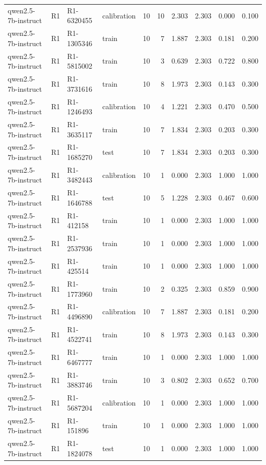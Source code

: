 \begin{table}
\begin{tabular}{llllrrrrrr}
qwen2.5-7b-instruct & R1 & R1-6320455 & calibration & 10 & 10 & 2.303 & 2.303 & 0.000 & 0.100 \\
qwen2.5-7b-instruct & R1 & R1-1305346 & train & 10 & 7 & 1.887 & 2.303 & 0.181 & 0.200 \\
qwen2.5-7b-instruct & R1 & R1-5815002 & train & 10 & 3 & 0.639 & 2.303 & 0.722 & 0.800 \\
qwen2.5-7b-instruct & R1 & R1-3731616 & train & 10 & 8 & 1.973 & 2.303 & 0.143 & 0.300 \\
qwen2.5-7b-instruct & R1 & R1-1246493 & calibration & 10 & 4 & 1.221 & 2.303 & 0.470 & 0.500 \\
qwen2.5-7b-instruct & R1 & R1-3635117 & train & 10 & 7 & 1.834 & 2.303 & 0.203 & 0.300 \\
qwen2.5-7b-instruct & R1 & R1-1685270 & test & 10 & 7 & 1.834 & 2.303 & 0.203 & 0.300 \\
qwen2.5-7b-instruct & R1 & R1-3482443 & calibration & 10 & 1 & 0.000 & 2.303 & 1.000 & 1.000 \\
qwen2.5-7b-instruct & R1 & R1-1646788 & test & 10 & 5 & 1.228 & 2.303 & 0.467 & 0.600 \\
qwen2.5-7b-instruct & R1 & R1-412158 & train & 10 & 1 & 0.000 & 2.303 & 1.000 & 1.000 \\
qwen2.5-7b-instruct & R1 & R1-2537936 & train & 10 & 1 & 0.000 & 2.303 & 1.000 & 1.000 \\
qwen2.5-7b-instruct & R1 & R1-425514 & train & 10 & 1 & 0.000 & 2.303 & 1.000 & 1.000 \\
qwen2.5-7b-instruct & R1 & R1-1773960 & train & 10 & 2 & 0.325 & 2.303 & 0.859 & 0.900 \\
qwen2.5-7b-instruct & R1 & R1-4496890 & calibration & 10 & 7 & 1.887 & 2.303 & 0.181 & 0.200 \\
qwen2.5-7b-instruct & R1 & R1-4522741 & train & 10 & 8 & 1.973 & 2.303 & 0.143 & 0.300 \\
qwen2.5-7b-instruct & R1 & R1-6467777 & train & 10 & 1 & 0.000 & 2.303 & 1.000 & 1.000 \\
qwen2.5-7b-instruct & R1 & R1-3883746 & train & 10 & 3 & 0.802 & 2.303 & 0.652 & 0.700 \\
qwen2.5-7b-instruct & R1 & R1-5687204 & calibration & 10 & 1 & 0.000 & 2.303 & 1.000 & 1.000 \\
qwen2.5-7b-instruct & R1 & R1-151896 & train & 10 & 1 & 0.000 & 2.303 & 1.000 & 1.000 \\
qwen2.5-7b-instruct & R1 & R1-1824078 & test & 10 & 1 & 0.000 & 2.303 & 1.000 & 1.000 \\

\end{tabular}
\end{table}
